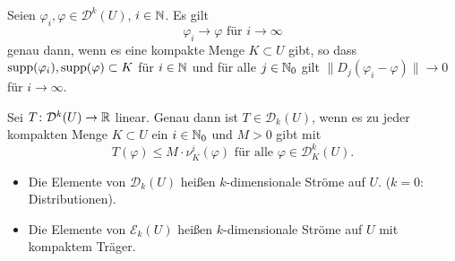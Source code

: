 \documentclass[a4paper,twoside,DIV15,BCOR12mm]{scrbook}
\begin{document}
\begin{lemma}
\label{lem:4.8}
Seien $\varphi_i, \varphi\in \mathcal D^k(U)$, $i\in \mathbb{N}$. Es gilt
\[
\varphi_i \to \varphi\text{ für }i\to\infty
\]
genau dann, wenn es eine kompakte Menge $K\subset U$ gibt, so dass $\mathop{\rm supp}\nolimits(\varphi_i), \mathop{\rm supp}\nolimits(\varphi) \subset K$ für $i\in \mathbb{N}$ und für alle $j\in\mathbb{N}_0$ gilt $\| D_j(\varphi_i - \varphi)\| \to 0$ für $i\to\infty$.
\end{lemma}

\begin{lemma}
\label{lem:4.9}
Sei $T\colon \mathcal D^k(U) \to\mathbb{R}$ linear. Genau dann ist $T\in \mathcal D_k(U)$, wenn es zu jeder kompakten Menge $K\subset U$ ein $i\in\mathbb{N}_0$ und $M>0$ gibt mit
\[
T(\varphi) \le M\cdot \nu_K^i(\varphi)  \text{ für alle } \varphi \in \mathcal D_K^k(U).
\]
\end{lemma}

\begin{definition}
\begin{itemize}
\item Die Elemente von $\mathcal D_k(U)$ heißen $k$-dimensionale Ströme auf $U$. ($k=0$: Distributionen).
\item Die Elemente von $\mathcal E_k(U)$ heißen $k$-dimensionale Ströme auf $U$ mit kompaktem Träger.
\end{itemize}
\end{definition}
\end{document}
